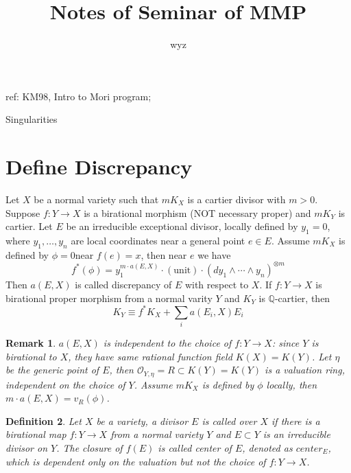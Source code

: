 \documentclass{article}
\title{Notes of Seminar of MMP}
\author{wyz}
\date{}
\newtheorem{defn}{Definition}[section]
\newtheorem{rmk}[defn]{Remark}
\begin{document}

ref: KM98, Intro to Mori program;

Singularities
\section{Define Discrepancy}
Let $ X $ be a normal variety such that $ mK_X $ is a cartier divisor with $ m>0 $. Suppose $ f:Y\to X $ is a birational morphism (NOT necessary proper) and $ mK_Y $ is cartier. Let $ E $ be an irreducible exceptional divisor, locally defined by $ y_1=0 $, where $ y_1,\ldots ,y_n $ are local coordinates near a general point $ e\in E $. Assume $ mK_X $ is defined by $ \phi=0 $near $ f(e)=x $, then near $ e $ we have
$$ f^*(\phi)=y_1^{m\cdot a(E,X)}\cdot (\text{unit})\cdot (dy_1\wedge\cdots\wedge y_n)^{\otimes m} $$
Then $ a(E,X) $ is called discrepancy of $ E $ with respect to $ X $. If $ f:Y\to X $ is birational proper morphism from a normal varity $ Y $ and $ K_Y $ is $ \mathbb{Q} $-cartier, then
$$ K_Y\equiv f^*K_X+\sum_i a(E_i,X)E_i $$
\begin{rmk}
	$ a(E,X) $ is independent to the choice of $ f:Y\to X $: since $ Y $ is birational to $ X $, they have same rational function field $ K(X)=K(Y) $. Let $ \eta  $ be the generic point of $ E $, then $ \mathcal{O}_{Y,\eta}=R\subset K(Y)=K(Y) $ is a valuation ring, independent on the choice of $ Y $. Assume $ mK_X $ is defined by $ \phi $ locally, then $ m\cdot a(E,X)=v_R(\phi) $.
\end{rmk}

\begin{defn}
	Let $ X $ be a variety, a divisor $ E $ is called over $ X $ if there is a birational map $ f:Y\to X $ from a normal variety $ Y $ and $ E\subset Y $ is an irreducible divisor on $ Y $. The closure of $ f(E) $ is called center of $ E $, denoted as $ center_E $, which is dependent only on the valuation but not the choice of $ f:Y\to X $.
\end{defn}
\end{document}
